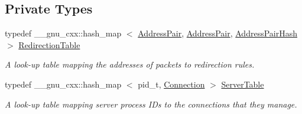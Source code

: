 \subsection*{\-Private \-Types}
\begin{DoxyCompactItemize}
\item 
typedef \-\_\-\-\_\-gnu\-\_\-cxx\-::hash\-\_\-map\*
$<$ \hyperlink{structNERD_1_1ConnectionServer_1_1AddressPair}{\-Address\-Pair}, \hyperlink{structNERD_1_1ConnectionServer_1_1AddressPair}{\-Address\-Pair}, \*
\hyperlink{classNERD_1_1ConnectionServer_1_1AddressPairHash}{\-Address\-Pair\-Hash} $>$ \hyperlink{classNERD_1_1ConnectionServer_a1f7b6abdda0f0a7a027a5f2e24727cee}{\-Redirection\-Table}
\begin{DoxyCompactList}\small\item\em \-A look-\/up table mapping the addresses of packets to redirection rules. \end{DoxyCompactList}\item 
typedef \-\_\-\-\_\-gnu\-\_\-cxx\-::hash\-\_\-map\*
$<$ pid\-\_\-t, \hyperlink{classNERD_1_1ConnectionServer_1_1Connection}{\-Connection} $>$ \hyperlink{classNERD_1_1ConnectionServer_a0cd661f2a6755c501ac198229675ad4d}{\-Server\-Table}
\begin{DoxyCompactList}\small\item\em \-A look-\/up table mapping server process \-I\-Ds to the connections that they manage. \end{DoxyCompactList}\end{DoxyCompactItemize}

